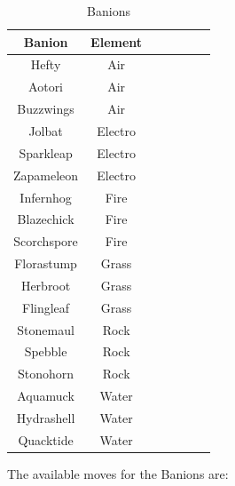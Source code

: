 \documentclass[12pt, a4paper]{report}
\begin{document}
\begin{table}[ht]
    \begin{center}
    \begin{tabular}{| c | c | c | c | c | c | c |}
        \hline
        Banion & Element \\ [0.5ex] %
        \hline\hline
        Hefty & Air \\
        \hline
        Aotori & Air \\
        \hline
        Buzzwings & Air \\
        \hline
        Jolbat & Electro \\
        \hline
        Sparkleap & Electro \\
        \hline
        Zapameleon & Electro \\
        \hline
        Infernhog & Fire \\
        \hline
        Blazechick & Fire \\
        \hline
        Scorchspore & Fire \\
        \hline
        Florastump & Grass \\
        \hline
        Herbroot & Grass \\
        \hline
        Flingleaf & Grass \\
        \hline
        Stonemaul & Rock \\
        \hline
        Spebble & Rock \\
        \hline
        Stonohorn & Rock \\
        \hline
        Aquamuck & Water \\
        \hline
        Hydrashell & Water \\
        \hline
        Quacktide & Water \\
        \hline
    \end{tabular}
    \caption{\label{table:banions} Banions}
    \end{center}
\end{table}

    The available moves for the Banions are:
\end{document}
